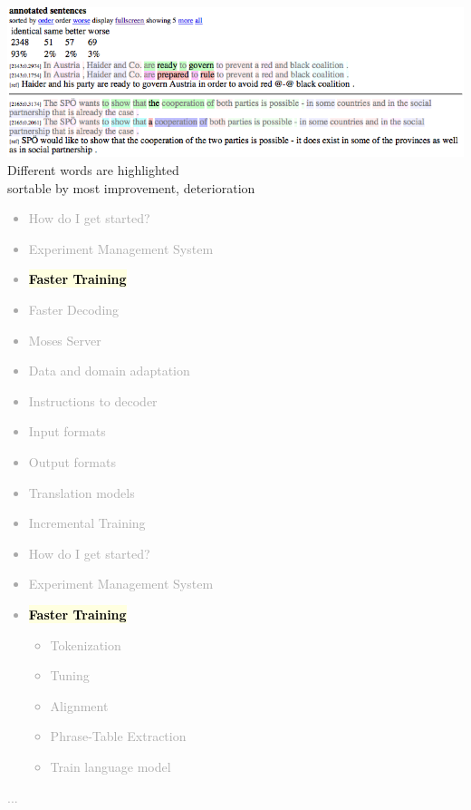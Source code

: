 \documentclass[landscape]{uedslides2C}
\newcommand{\currenttopic}[1]{\colorbox{lightyellow}{\textcolor{black}{\bf #1}}}
\begin{document}

\begin{center}
\includegraphics[scale=1]{analysis-comparison.png}\\[10mm]
Different words are highlighted\\[3mm]
sortable by most improvement, deterioration
\end{center}


\vspace{-5mm}
\textcolor{darkgrey}{
\small
\begin{itemize} \itemsep -1mm
\item {How do I get started?}
\item {Experiment Management System}
\item \currenttopic{Faster Training}
\item {Faster Decoding}
\item {Moses Server}
\item {Data and domain adaptation}
\item {Instructions to decoder}
\item {Input formats}
\item {Output formats}
\item {Translation models}
\item {Incremental Training}
\end{itemize}
}


\vspace{-5mm}
\textcolor{darkgrey}{
\begin{itemize} \itemsep -1mm
\item {How do I get started?}
\item {Experiment Management System}
\item \currenttopic{Faster Training}
  \begin{itemize}
  \item Tokenization
  \item Tuning
  \item Alignment
  \item Phrase-Table Extraction
  \item Train language model
  \end{itemize}
\end{itemize}
...
}
\end{document}
